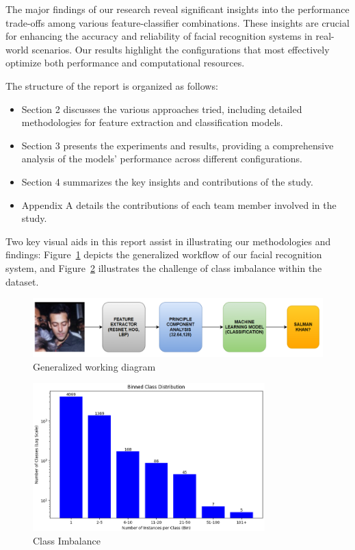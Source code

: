 \documentclass[a4paper]{article}
\theoremstyle{plain}
\theoremstyle{definition}
\begin{document}
The major findings of our research reveal significant insights into the performance trade-offs among various feature-classifier combinations. These insights are crucial for enhancing the accuracy and reliability of facial recognition systems in real-world scenarios. Our results highlight the configurations that most effectively optimize both performance and computational resources.

The structure of the report is organized as follows:
\begin{itemize}
    \item Section 2 discusses the various approaches tried, including detailed methodologies for feature extraction and classification models.
    \item Section 3 presents the experiments and results, providing a comprehensive analysis of the models' performance across different configurations.
    \item Section 4 summarizes the key insights and contributions of the study.
    \item Appendix A details the contributions of each team member involved in the study.
\end{itemize}

Two key visual aids in this report assist in illustrating our methodologies and findings: Figure~\ref{fig:workflow} depicts the generalized workflow of our facial recognition system, and Figure~\ref{fig:class_imbalance} illustrates the challenge of class imbalance within the dataset.





\begin{figure}[hbt!]
    \centering
    \includegraphics[width=1.0\textwidth]{figs/lfw_image.png}
    \caption{Generalized working diagram}
    \label{fig:workflow}
\end{figure}

\begin{figure}[hbt!]
    \centering
    \includegraphics[width=0.8\textwidth,height=0.25\textheight]{figs/Image.png}
    \caption{Class Imbalance}
    \label{fig:class_imbalance}
\end{figure}
\end{document}
